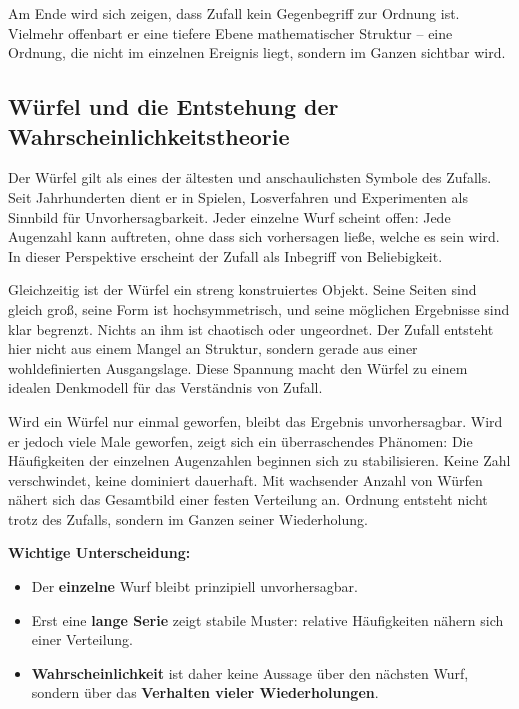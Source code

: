 Am Ende wird sich zeigen,
dass Zufall kein Gegenbegriff zur Ordnung ist.
Vielmehr offenbart er eine tiefere Ebene mathematischer Struktur --
eine Ordnung,
die nicht im einzelnen Ereignis liegt,
sondern im Ganzen sichtbar wird.






\subsection{Würfel und die Entstehung der Wahrscheinlichkeitstheorie}

Der Würfel gilt als eines der ältesten und anschaulichsten Symbole des Zufalls.
Seit Jahrhunderten dient er in Spielen, Losverfahren und Experimenten
als Sinnbild für Unvorhersagbarkeit.
Jeder einzelne Wurf scheint offen:
Jede Augenzahl kann auftreten,
ohne dass sich vorhersagen ließe,
welche es sein wird.
In dieser Perspektive erscheint der Zufall
als Inbegriff von Beliebigkeit.

Gleichzeitig ist der Würfel ein streng konstruiertes Objekt.
Seine Seiten sind gleich groß,
seine Form ist hochsymmetrisch,
und seine möglichen Ergebnisse sind klar begrenzt.
Nichts an ihm ist chaotisch oder ungeordnet.
Der Zufall entsteht hier nicht aus einem Mangel an Struktur,
sondern gerade aus einer wohldefinierten Ausgangslage.
Diese Spannung macht den Würfel
zu einem idealen Denkmodell für das Verständnis von Zufall.

Wird ein Würfel nur einmal geworfen,
bleibt das Ergebnis unvorhersagbar.
Wird er jedoch viele Male geworfen,
zeigt sich ein überraschendes Phänomen:
Die Häufigkeiten der einzelnen Augenzahlen beginnen sich zu stabilisieren.
Keine Zahl verschwindet,
keine dominiert dauerhaft.
Mit wachsender Anzahl von Würfen
nähert sich das Gesamtbild einer festen Verteilung an.
Ordnung entsteht nicht trotz des Zufalls,
sondern im Ganzen seiner Wiederholung.

\begin{DidacticBox}
	\label{box:einzelwurf}
	\small
	\textbf{Wichtige Unterscheidung:}
	\begin{itemize}
		\item Der \textbf{einzelne} Wurf bleibt prinzipiell unvorhersagbar.
		\item Erst eine \textbf{lange Serie} zeigt stabile Muster: relative Häufigkeiten nähern sich einer Verteilung.
		\item \textbf{Wahrscheinlichkeit} ist daher keine Aussage über den nächsten Wurf, sondern über das \textbf{Verhalten vieler Wiederholungen}.
	\end{itemize}
\end{DidacticBox}

